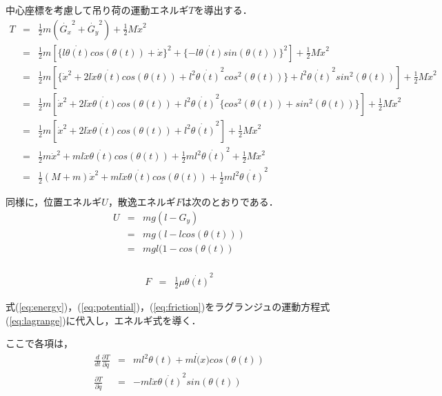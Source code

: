 \documentclass[dvipdfmx,titlepage,a4j]{jsarticle}  %
\begin{document}
中心座標を考慮して吊り荷の運動エネルギ$T$を導出する．
\begin{eqnarray}
  T &=& \frac{1}{2} m (\dot{G_x}^2 + \dot{G_y}^2) + \frac{1}{2}M\dot{x}^2\nonumber \\
  &=& \frac{1}{2} m [ \{l \dot{\theta(t)} cos(\theta(t)) + \dot x\}^2 + \{ -l \dot{\theta(t)} sin(\theta(t))\}^2 ] + \frac{1}{2}M\dot{x}^2 \nonumber \\
  &=& \frac{1}{2} m [\{ \dot x^2 + 2 l \dot{x} \dot{\theta(t)} cos(\theta(t)) + l^2 \dot{\theta(t)}^2 cos^2(\theta(t)) \} + l^2 \dot{\theta(t)}^2 sin^2(\theta(t))] + \frac{1}{2}M\dot{x}^2 \nonumber \\
  &=& \frac{1}{2} m [\dot x^2 + 2 l \dot{x} \dot{\theta(t)} cos(\theta(t)) + l^2 \dot{\theta(t)}^2 \{ cos^2(\theta(t)) + sin^2(\theta(t)) \}] + \frac{1}{2}M\dot{x}^2 \nonumber \\
  &=& \frac{1}{2} m [\dot x^2 + 2 l \dot{x} \dot{\theta(t)} cos(\theta(t)) + l^2 \dot{\theta(t)}^2] + \frac{1}{2}M\dot{x}^2 \nonumber \\
  &=& \frac{1}{2} m \dot x^2 + m l \dot{x} \dot{\theta(t)} cos(\theta(t)) + \frac{1}{2} m l^2 \dot{\theta(t)}^2 + \frac{1}{2}M\dot{x}^2 \nonumber \\
  &=& \frac{1}{2} (M + m)\dot x^2 + m l \dot{x} \dot{\theta(t)} cos(\theta(t)) + \frac{1}{2} m l^2 \dot{\theta(t)}^2 \label{eq:energy}
\end{eqnarray}

同様に，位置エネルギ$U$，散逸エネルギ$F$は次のとおりである．
\begin{eqnarray}
  U &=& mg(l - G_y) \nonumber \\
  &=& mg(l - l cos(\theta(t))) \nonumber \\
  &=& mgl(1 - cos(\theta(t)) \label{eq:potential}\\
\end{eqnarray}

\begin{eqnarray}
  F &=& \frac{1}{2} \mu  \dot{\theta(t)}^2 \label{eq:friction}
\end{eqnarray}

式(\ref{eq:energy})，(\ref{eq:potential})，(\ref{eq:friction})をラグランジュの運動方程式(\ref{eq:lagrange})に代入し，エネルギ式を導く．

ここで各項は，
\begin{eqnarray}
  \frac{d}{dt} \frac{\partial T}{\partial \dot{q}} &=& m l^2 \theta(t) + m l \dot(x) cos(\theta(t)) \nonumber \\
  \frac{\partial T}{\partial \dot{q}} &=&  -m l \dot x \dot{\theta(t)}^2 sin(\theta(t))\nonumber \\
\end{eqnarray}
\end{document}
